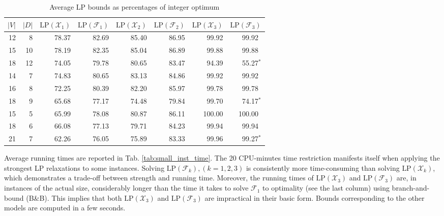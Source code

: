 \begin{table}[h!]
\centering
\setlength{\tabcolsep}{6pt} %
\renewcommand{\arraystretch}{1.4} %
\begin{tabular}{rrrrrrrr}
$|V|$ & $|D|$ & $\text{LP}(\mathcal{X}_1)$ & $\text{LP}(\mathcal{F}_1)$ & $\text{LP}(\mathcal{X}_2)$ & $\text{LP}(\mathcal{F}_2)$ & $\text{LP}(\mathcal{X}_3)$ &$\text{LP}(\mathcal{F}_3)$\\\hline
  12 & 8       & 78.37  & 82.69  & 85.40    & 86.95    & 99.92  &  99.92\textcolor{white}{$^*$} \\
  15 & 10      & 78.19  & 82.35  & 85.04    & 86.89    & 99.88  &  99.88\textcolor{white}{$^*$} \\
  18 & 12      & 74.05  & 79.78  & 80.65    & 83.47    & 94.39  &  55.27$^*$                    \\\hline
  14 & 7       & 74.83  & 80.65  & 83.13    & 84.86    & 99.92  &  99.92\textcolor{white}{$^*$} \\
  16 & 8       & 72.25  & 80.39  & 82.20    & 85.97    & 99.78  &  99.78\textcolor{white}{$^*$} \\
  18 & 9       & 65.68  & 77.17  & 74.48    & 79.84    & 99.70  &  74.17$^*$                    \\ \hline
  15 & 5       & 65.99  & 78.08  & 80.87    & 86.11    & 100.00 & 100.00\textcolor{white}{$^*$} \\ 
  18 & 6       & 66.08  & 77.13  & 79.71    & 84.23    & 99.94  &  99.94\textcolor{white}{$^*$} \\ 
  21 & 7       & 62.26  & 76.05  & 75.89    & 83.33    & 99.96  &  99.27$^*$
\end{tabular}
\caption{Average LP bounds as percentages of integer optimum}
\label{tab:small_inst_cost}
\end{table}

Average running times are reported in Tab. \ref{tab:small_inst_time}.
The 20 CPU-minutes time restriction manifests itself when applying the strongest LP relaxations to some instances.
Solving $\text{LP}(\mathcal{F}_k), (k=1,2,3)$ is consistently more time-consuming than solving $\text{LP}(\mathcal{X}_k)$, 
which demonstrates a trade-off between strength and running time.  
Moreover, the running times of $\text{LP}(\mathcal{X}_3)$ and $\text{LP}(\mathcal{F}_3)$ are, in instances of the actual size, 
considerably longer than the time it takes to solve $\mathcal{F}_1$ to optimality (see the last column) using branch-and-bound (B\&B).
This implies that both $\text{LP}(\mathcal{X}_3)$ and $\text{LP}(\mathcal{F}_3)$ are impractical in their basic form.
Bounds corresponding to the other models are computed in a few seconds.

